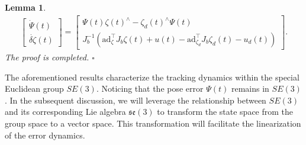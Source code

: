 \documentclass[lettersize,journal]{IEEEtran}
\newtheorem{mylem}{Lemma}
\newcommand{\ad}{\text{ad}}
\begin{document}
\begin{mylem}
\begin{equation*}
    \begin{aligned}
        \begin{bmatrix}
            \dot{\Psi}(t)\\ \dot{\delta \zeta}(t)
        \end{bmatrix} = \begin{bmatrix}
            \Psi(t) \zeta(t)^{\wedge}-\zeta_{d}(t)^{\wedge} \Psi(t)\\
            J_b^{-1} (\ad_{\zeta}^{\top}J_b\zeta(t) + u(t) -\ad_{\zeta_d}^{\top}J_b\zeta_d(t) - u_d(t))
        \end{bmatrix}.
    \end{aligned}
\end{equation*}
The proof is completed. \hfill $\square$ 
\end{mylem}


The aforementioned results characterize the tracking dynamics within the special Euclidean group $SE(3)$. Noticing that the pose error $\Psi(t)$ remains in $SE(3)$. In the subsequent discussion, we will leverage the relationship between $SE(3)$ and its corresponding Lie algebra $\mathfrak{se}(3)$ to transform the state space from the group space to a vector space. This transformation will facilitate the linearization of the error dynamics.
\end{document}
